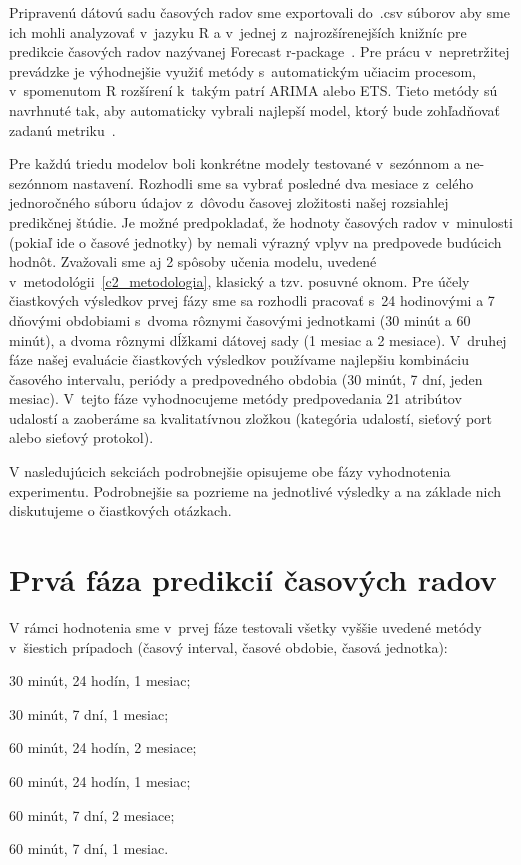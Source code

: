 \documentclass[thesismargins, thesislinespacing, openright, upjsfrontpage]{rnthesis}
\begin{document}
Pripravenú dátovú sadu časových radov sme exportovali do~.csv súborov aby sme ich mohli analyzovať v~jazyku R a v~jednej z~najrozšírenejších knižníc pre predikcie časových radov nazývanej Forecast r-package~\cite{hyndman2007automatic}. Pre prácu v~nepretržitej prevádzke je výhodnejšie využiť metódy s~automatickým učiacim procesom, v~spomenutom R rozšírení k~takým patrí ARIMA alebo ETS. Tieto metódy sú navrhnuté tak, aby automaticky vybrali najlepší model, ktorý bude zohľadňovať zadanú metriku~\cite{hyndman2007automatic}.

Pre každú triedu modelov boli konkrétne modely testované v~sezónnom a ne-sezónnom nastavení. Rozhodli sme sa vybrať posledné dva mesiace z~celého jednoročného súboru údajov z~dôvodu časovej zložitosti našej rozsiahlej predikčnej štúdie. Je možné predpokladať, že hodnoty časových radov v~minulosti (pokiaľ ide o časové jednotky) by nemali výrazný vplyv na predpovede budúcich hodnôt. Zvažovali sme aj 2 spôsoby učenia modelu, uvedené v~metodológii~\ref{c2_metodologia}, klasický a tzv. posuvné oknom. Pre účely čiastkových výsledkov prvej fázy sme sa rozhodli pracovať s~24 hodinovými a 7 dňovými obdobiami s~dvoma rôznymi časovými jednotkami (30 minút a 60 minút), a dvoma rôznymi dĺžkami dátovej sady (1 mesiac a 2 mesiace). V~druhej fáze našej evaluácie čiastkových výsledkov používame najlepšiu kombináciu časového intervalu, periódy a predpovedného obdobia (30 minút, 7 dní, jeden mesiac). V~tejto fáze vyhodnocujeme metódy predpovedania 21 atribútov udalostí a zaoberáme sa kvalitatívnou zložkou (kategória udalostí, sieťový port alebo sieťový protokol).

V nasledujúcich sekciách podrobnejšie opisujeme obe fázy vyhodnotenia experimentu. Podrobnejšie sa pozrieme na jednotlivé výsledky a na základe nich diskutujeme o čiastkových otázkach.

\section{Prvá fáza predikcií časových radov}

V rámci hodnotenia sme v~prvej fáze testovali všetky vyššie uvedené metódy v~šiestich prípadoch (časový interval, časové obdobie, časová jednotka): 
\begin{compactenum}
    \item 30 minút, 24 hodín, 1 mesiac; 
    \item 30 minút, 7 dní, 1 mesiac; 
    \item 60 minút, 24 hodín, 2 mesiace; 
    \item 60 minút, 24 hodín, 1 mesiac; 
    \item 60 minút, 7 dní, 2 mesiace; 
    \item 60 minút, 7 dní, 1 mesiac.
\end{compactenum}
\end{document}
